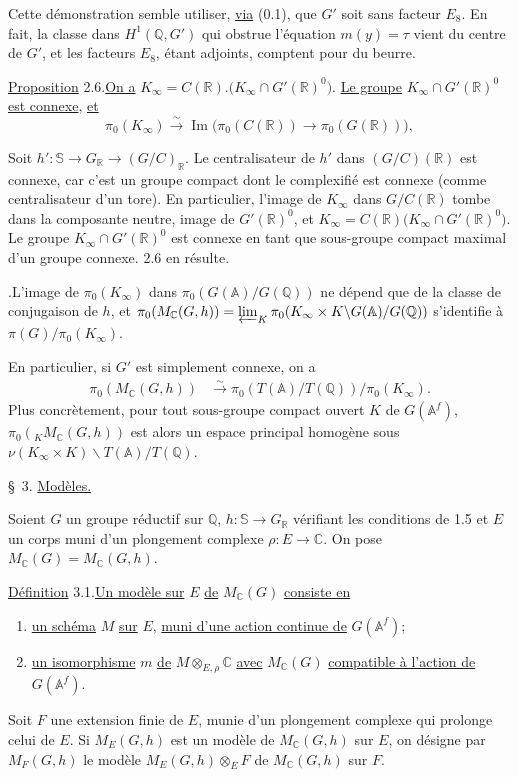 \documentclass[10pt]{article}
\newcommand{\A}{\mathbb A}
\newcommand{\Af}{\mathbb A^f}
\newcommand{\C}{\mathbb C}
\newcommand{\Q}{\mathbb Q}
\newcommand{\R}{\mathbb R}
\newcommand{\bS}{\mathbb S}
\newcommand{\limproj}{\varprojlim}
\newcommand{\MC}{M_{\C}}
\begin{document}
Cette démonstration semble utiliser, \uline{via} (0.1), que $G'$ soit sans facteur $E_8$. En fait, la classe dans $H^1(\Q,G')$ qui obstrue l'équation $m(y)=\tau$ vient du centre de $G'$, et les facteurs $E_8$, étant adjoints, comptent pour du beurre.

\noindent\uline{Proposition} 2.6.\quad \uline{On a} $K_\infty=C(\R).\bigl(K_\infty\cap G'(\R)^0\bigr)$. \uline{Le groupe} $K_\infty\cap G'(\R)^0$ \uline{est connexe}, \uline{et}
\[
\pi_0(K_\infty)\xrightarrow{\sim}\operatorname{Im}\bigl(\pi_0(C(\R))\longrightarrow\pi_0(G(\R))\bigr),
\]

Soit $h':\bS\to G_\R\to(G/C)_\R$. Le centralisateur de $h'$ dans $(G/C)(\R)$ est connexe, car c'est un groupe compact dont le complexifié est connexe (comme centralisateur d'un tore). En particulier, l'image de $K_\infty$ dans $G/C(\R)$ tombe dans la composante neutre, image de $G'(\R)^0$, et $K_\infty=C(\R)\bigl(K_\infty\cap G'(\R)^0\bigr)$. Le groupe $K_\infty\cap G'(\R)^0$ est connexe en tant que sous-groupe compact maximal d'un groupe connexe. 2.6 en résulte.

.\quad L'image de $\pi_0(K_\infty)$ dans $\pi_0(G(\A)/G(\Q))$ ne dépend que de la classe de conjugaison de $h$, et $\pi_0(\MC(G,h))=\limproj_K\pi_0(K_\infty\times K\backslash G(\A)/G(\Q))$ s'identifie à $\pi(G)/\pi_0(K_\infty)$.

En particulier, si $G'$ est simplement connexe, on a
\begingroup
\makeatletter
\tagsleft@true
\makeatother
\begin{align}
\pi_0(\MC(G,h))&\xrightarrow{\sim}\pi_0(T(\A)/T(\Q))/\pi_0(K_\infty). \tag{2.7.1}
\end{align}
\endgroup
Plus concrètement, pour tout sous-groupe compact ouvert $K$ de $G(\Af)$, $\pi_0({}_K\MC(G,h))$ est alors un espace principal homogène sous $\nu(K_\infty\times K)\backslash T(\A)/T(\Q)$.

\noindent \S\ 3. \uline{Modèles.}\par\vspace{0.9em}

Soient $G$ un groupe réductif sur $\Q$, $h:\bS\to G_\R$ vérifiant les conditions de 1.5 et $E$ un corps muni d'un plongement complexe $\rho:E\to\C$. On pose $\MC(G)=\MC(G,h)$.

\noindent\uline{Définition} 3.1.\quad \uline{Un modèle sur} $E$ \uline{de} $\MC(G)$ \uline{consiste en}
\begin{enumerate}[label=(\alph*),leftmargin=2.4em]
\item \uline{un schéma} $M$ \uline{sur} $E$, \uline{muni d'une action continue de} $G(\Af)$;
\item \uline{un isomorphisme} $m$ \uline{de} $M\otimes_{E,\rho}\C$ \uline{avec} $\MC(G)$ \uline{compatible à l'action de} $G(\Af)$.
\end{enumerate}
Soit $F$ une extension finie de $E$, munie d'un plongement complexe qui prolonge celui de $E$. Si $M_E(G,h)$ est un modèle de $\MC(G,h)$ sur $E$, on désigne par $M_F(G,h)$ le modèle $M_E(G,h)\otimes_E F$ de $\MC(G,h)$ sur $F$.
\end{document}
